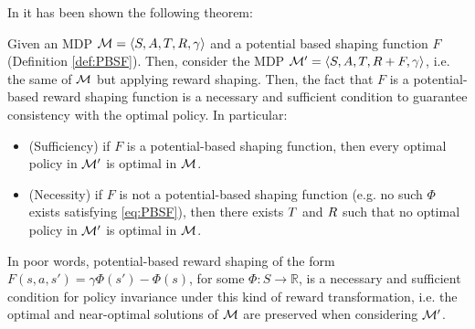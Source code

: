 In \citep{Ng:1999:PIU:645528.657613} it has been shown the following theorem: 
\begin{theorem}\label{th:PBSF}
	Given an MDP $\mathcal{M} = \langle S, A, T, R, \gamma \rangle$ and a potential based shaping function $F$ (Definition \ref{def:PBSF}). 
	Then, consider the MDP $\mathcal{M}' = \langle S, A, T, R + F, \gamma \rangle$, i.e. the same of $\mathcal{M}$ but applying reward shaping. Then, the fact that $F$ is a potential-based reward shaping function is a necessary and sufficient condition to guarantee consistency with the optimal policy. In particular:
	\begin{itemize}
		\item (Sufficiency) if $F$ is a potential-based shaping function, then every optimal policy in $\mathcal{M}'$ is optimal in $\mathcal{M}$.
		\item (Necessity) if $F$ is not a potential-based shaping function (e.g. no such $\Phi$ exists satisfying \ref{eq:PBSF}), then there exists $T$ and $R$ such that no optimal policy in $\mathcal{M}'$ is optimal in $\mathcal{M}$.
	\end{itemize}
\end{theorem}
In poor words, potential-based reward shaping of the form $F(s, a, s') = \gamma\Phi(s') - \Phi(s)$, for some $\Phi: S \to \mathbb{R}$, is a necessary and sufficient condition for policy invariance under this kind of reward transformation, i.e. the optimal and near-optimal solutions of $\mathcal{M}$ are preserved when considering $\mathcal{M}'$.





